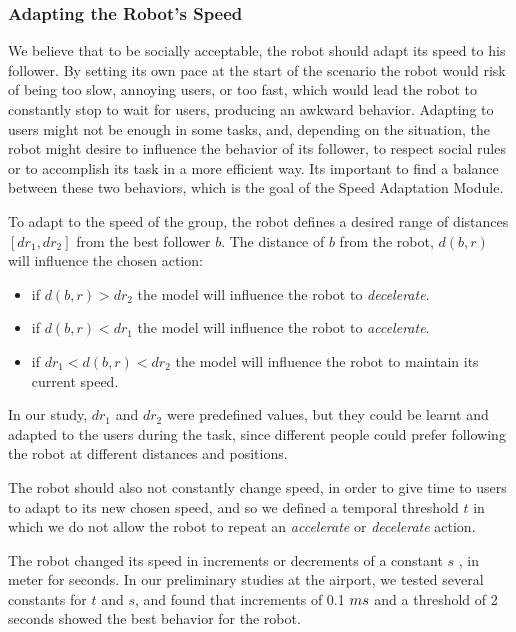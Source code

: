 \subsubsection{Adapting the Robot's Speed}
We believe that to be socially acceptable, the robot should adapt its speed to his follower. By setting its own pace at the start of the scenario the robot  would risk of being too slow, annoying users, or too fast, which would lead the robot to constantly stop to wait for users, producing an awkward behavior. Adapting to users might not be enough in some tasks, and, depending on the situation, the robot might desire to influence the behavior of its follower, to respect social rules or to accomplish its task in a more efficient way. Its important to find a balance between these two behaviors, which is the goal of the Speed Adaptation Module. 

To adapt to the speed of the group, the robot defines a desired range of distances $[dr_1,dr_2]$ from the best follower $b$. The distance of $b$ from the robot, $d(b,r)$ will influence the chosen action:
\begin{itemize}
\item if $d(b,r)>dr_2$  the model will influence the robot to \textit{decelerate}.
\item if $d(b,r)<dr_1$ the model will influence the robot to \textit{accelerate}.
\item if $dr_1<d(b,r)<dr_2$ the model will influence the robot to maintain its current speed.
\end{itemize} 

In our study, $dr_1$ and $dr_2$ were predefined values, but they could be learnt and adapted to the users during the task, since different people could prefer following the robot at different distances and positions.

The robot should also not constantly change speed, in order to give time to users to adapt to its new chosen speed, and so we defined a temporal threshold $t$ in which we do not allow the robot to repeat an \textit{accelerate} or \textit{decelerate} action.

The robot changed its speed in increments or decrements of a constant $s$ , in meter for seconds. In our preliminary studies at the airport, we tested several constants for $t$ and $s$, and found that increments of 0.1 $m\/s$ and a threshold of 2 seconds showed the best behavior for the robot. 
  
